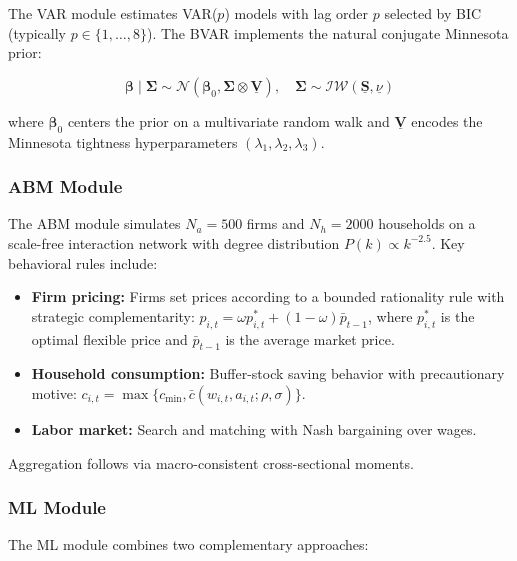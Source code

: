 \documentclass[12pt,a4paper]{article}
\begin{document}
The VAR module estimates VAR($p$) models with lag order $p$ selected
by BIC (typically $p \in \{1, \ldots, 8\}$).  The BVAR implements
the natural conjugate Minnesota prior:

\begin{equation}
    \boldsymbol{\beta} \mid \boldsymbol{\Sigma} \sim
    \mathcal{N}\left(\boldsymbol{\beta}_0,
    \boldsymbol{\Sigma} \otimes \underline{\mathbf{V}}\right),
    \quad \boldsymbol{\Sigma} \sim \mathcal{IW}(\underline{\mathbf{S}},
    \underline{\nu}) \label{eq:bvar_prior}
\end{equation}

where $\boldsymbol{\beta}_0$ centers the prior on a multivariate
random walk and $\underline{\mathbf{V}}$ encodes the Minnesota
tightness hyperparameters $(\lambda_1, \lambda_2, \lambda_3)$.

\subsubsection{ABM Module}

The ABM module simulates $N_a = 500$ firms and $N_h = 2000$
households on a scale-free interaction network with degree
distribution $P(k) \propto k^{-2.5}$.  Key behavioral rules include:

\begin{itemize}[leftmargin=*]
    \item \textbf{Firm pricing:} Firms set prices according to a
    bounded rationality rule with strategic complementarity:
    $p_{i,t} = \omega p_{i,t}^* + (1-\omega) \bar{p}_{t-1}$, where
    $p_{i,t}^*$ is the optimal flexible price and $\bar{p}_{t-1}$
    is the average market price.
    \item \textbf{Household consumption:} Buffer-stock saving
    behavior with precautionary motive:
    $c_{i,t} = \max\{c_{\min}, \bar{c}(w_{i,t}, a_{i,t}; \rho, \sigma)\}$.
    \item \textbf{Labor market:} Search and matching with Nash
    bargaining over wages.
\end{itemize}

Aggregation follows via macro-consistent cross-sectional moments.

\subsubsection{ML Module}

The ML module combines two complementary approaches:
\end{document}
